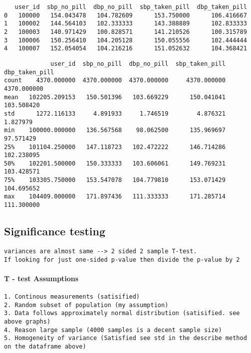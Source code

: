 \documentclass[11pt]{article}
\begin{document}
    
    \begin{verbatim}
   user_id  sbp_no_pill  dbp_no_pill  sbp_taken_pill  dbp_taken_pill
0   100000   154.043478   104.782609      153.750000      106.416667
1   100002   144.564103   102.333333      143.388889      102.833333
2   100003   140.971429   100.828571      141.210526      100.315789
3   100006   150.256410   104.205128      150.055556      102.444444
4   100007   152.054054   104.216216      151.052632      104.368421
    \end{verbatim}

    
    
    \begin{verbatim}
             user_id  sbp_no_pill  dbp_no_pill  sbp_taken_pill  dbp_taken_pill
count    4370.000000  4370.000000  4370.000000     4370.000000     4370.000000
mean   102205.209153   150.501396   103.669229      150.041041      103.508420
std      1272.116133     4.891933     1.746519        4.876321        1.827979
min    100000.000000   136.567568    98.062500      135.969697       97.571429
25%    101104.250000   147.118723   102.472222      146.714286      102.238095
50%    102201.500000   150.333333   103.606061      149.769231      103.428571
75%    103305.750000   153.547078   104.779810      153.071429      104.695652
max    104409.000000   171.897436   111.333333      171.285714      111.300000
    \end{verbatim}

    
    \hypertarget{significance-testing}{%
\subsection{Significance testing}\label{significance-testing}}

\begin{verbatim}
variances are almost same --> 2 sided 2 sample T-test. 
If looking for just one-sided p-value then divide the p-value by 2
\end{verbatim}

    \hypertarget{t---test-assumptions}{%
\paragraph{T - test Assumptions}\label{t---test-assumptions}}

\begin{verbatim}
1. Continous measurements (satisified)
2. Random subset of population (my assumption)
3. Data follows approximately normal distribution (satisified. see above graphs)
4. Reason large sample (4000 samples is a decent sample size)
5. Homogeneity of variance (Satisfied see std in the describe method on the dataframe above)
\end{verbatim}
\end{document}
